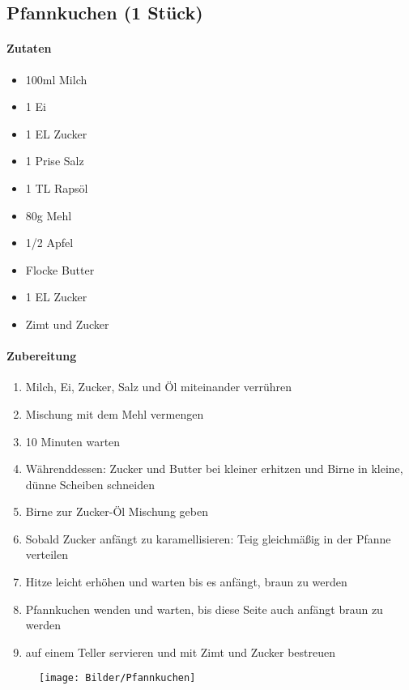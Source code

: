 \newpage
\subsection{Pfannkuchen (1 Stück)}
\paragraph{Zutaten}
\begin{itemize}[noitemsep]
	\item 100ml Milch
	\item 1 Ei
	\item 1 EL Zucker
	\item 1 Prise Salz
	\item 1 TL Rapsöl
	\item 80g Mehl
	\item 1/2 Apfel
	\item Flocke Butter
	\item 1 EL Zucker
	\item Zimt und Zucker
\end{itemize}
\paragraph{Zubereitung}
\begin{enumerate}[noitemsep]
	\item Milch, Ei, Zucker, Salz und Öl miteinander verrühren 
	\item Mischung mit dem Mehl vermengen 
	\item 10 Minuten warten 
	\item Währenddessen: Zucker und Butter bei kleiner erhitzen und Birne in kleine, dünne Scheiben schneiden
	\item Birne zur Zucker-Öl Mischung geben
	\item Sobald Zucker anfängt zu karamellisieren: Teig gleichmäßig in der Pfanne verteilen
	\item Hitze leicht erhöhen und warten bis es anfängt, braun zu werden
	\item Pfannkuchen wenden und warten, bis diese Seite auch anfängt braun zu werden
	\item auf einem Teller servieren und mit Zimt und Zucker bestreuen 
\end{enumerate}
\begin{figure}[h]
\centering
\texttt{[image: Bilder/Pfannkuchen]}
\end{figure}
